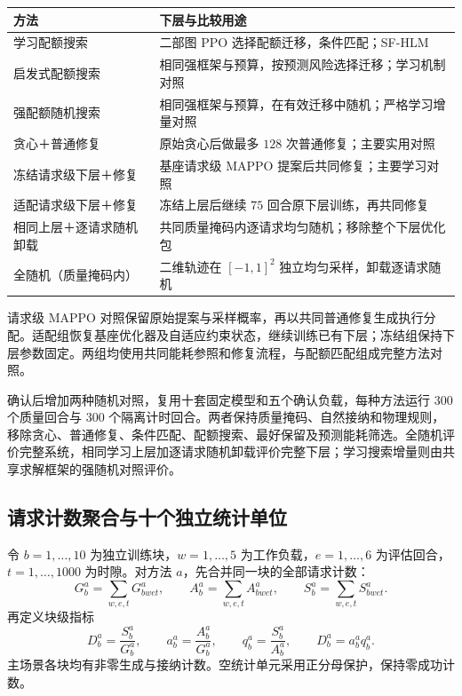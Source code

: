 \begin{table}[!htbp]
 \centering
 \label{legacy:tab:ch5-controls}
 \small
 \begin{tabularx}{\textwidth}{p{}Y}
  \toprule
  方法 & 下层与比较用途 \\
  \midrule
  学习配额搜索 & 二部图 PPO 选择配额迁移，条件匹配；SF-HLM \\
  启发式配额搜索 & 相同强框架与预算，按预测风险选择迁移；学习机制对照 \\
  强配额随机搜索 & 相同强框架与预算，在有效迁移中随机；严格学习增量对照 \\
  贪心＋普通修复 & 原始贪心后做最多 $128$ 次普通修复；主要实用对照 \\
  冻结请求级下层＋修复 & 基座请求级 MAPPO 提案后共同修复；主要学习对照 \\
  适配请求级下层＋修复 & 冻结上层后继续 $75$ 回合原下层训练，再共同修复 \\
  相同上层＋逐请求随机卸载 & 共同质量掩码内逐请求均匀随机；移除整个下层优化包 \\
  全随机（质量掩码内） & 二维轨迹在 $[-1,1]^2$ 独立均匀采样，卸载逐请求随机 \\
  \bottomrule
 \end{tabularx}
\end{table}

请求级 MAPPO 对照保留原始提案与采样概率，再以共同普通修复生成执行分配。适配组恢复基座优化器及自适应约束状态，继续训练已有下层；冻结组保持下层参数固定。两组均使用共同能耗参照和修复流程，与配额匹配组成完整方法对照。

确认后增加两种随机对照，复用十套固定模型和五个确认负载，每种方法运行 $300$ 个质量回合与 $300$ 个隔离计时回合。两者保持质量掩码、自然接纳和物理规则，移除贪心、普通修复、条件匹配、配额搜索、最好保留及预测能耗筛选。全随机评价完整系统，相同学习上层加逐请求随机卸载评价完整下层；学习搜索增量则由共享求解框架的强随机对照评价。

\subsection{请求计数聚合与十个独立统计单位}

令 $b=1,\ldots,10$ 为独立训练块，$w=1,\ldots,5$ 为工作负载，$e=1,\ldots,6$ 为评估回合，$t=1,\ldots,1000$ 为时隙。对方法 $a$，先合并同一块的全部请求计数：
\begin{equation}
 G_b^a=\sum_{w,e,t}G_{bwet}^a,\qquad
 A_b^a=\sum_{w,e,t}A_{bwet}^a,\qquad
 S_b^a=\sum_{w,e,t}S_{bwet}^a.
 \label{legacy:eq:ch5-block-counters}
\end{equation}
再定义块级指标
\begin{equation}
 D_b^a=\frac{S_b^a}{G_b^a},\qquad
 a_b^a=\frac{A_b^a}{G_b^a},\qquad
 q_b^a=\frac{S_b^a}{A_b^a},\qquad D_b^a=a_b^aq_b^a.
 \label{legacy:eq:ch5-block-metrics}
\end{equation}
主场景各块均有非零生成与接纳计数。空统计单元采用正分母保护，保持零成功计数。

